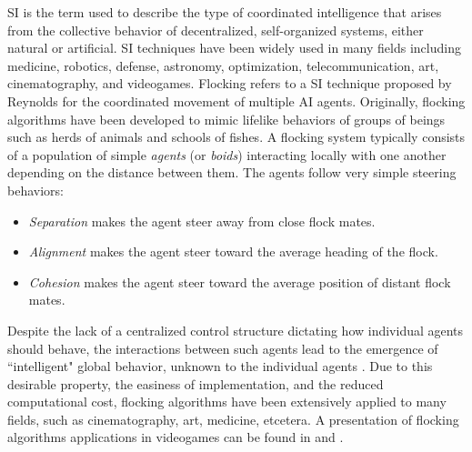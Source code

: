 \documentclass[a4paper]{llncs}
\begin{document}
SI \cite{BeniWang89} is the term used to describe the type of coordinated intelligence that arises from the collective behavior of decentralized, self-organized systems, either natural or artificial. SI techniques have been widely used in many fields including medicine, robotics, defense, astronomy, optimization, telecommunication, art, cinematography, and videogames. Flocking refers to a SI technique proposed by Reynolds \cite{Reynolds87} for the coordinated movement of multiple AI agents. Originally, flocking algorithms have been developed to mimic lifelike behaviors of groups of beings such as herds of animals and schools of fishes. A flocking system typically consists of a population of simple \textit{agents} (or \textit{boids}) interacting locally with one another depending on the distance between them. The agents follow very simple steering behaviors:

\begin{itemize}
	\item \textit{Separation} makes the agent steer away from close flock mates.
	\item \textit{Alignment} makes the agent steer toward the average heading of the flock.
	\item \textit{Cohesion} makes the agent steer toward the average position of distant flock mates.
\end{itemize} 

Despite the lack of a centralized control structure dictating how individual agents should behave, the interactions between such agents lead to the emergence of ``intelligent" global behavior, unknown to the individual agents \cite{SpectorEtAl03}. Due to this desirable property, the easiness of implementation, and the reduced computational cost, flocking algorithms have been extensively applied to many fields, such as cinematography, art, medicine, etcetera. A presentation of flocking algorithms applications in videogames can be found in \cite{Scutt02} and \cite{Rabin10}.
\end{document}
